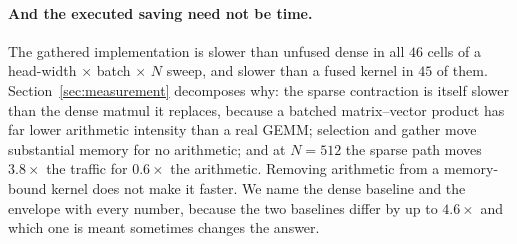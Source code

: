 \paragraph{And the executed saving need not be time.} The gathered
implementation is slower than unfused dense in all $46$ cells of a head-width
$\times$ batch $\times$ $N$ sweep, and slower than a fused kernel in $45$ of
them. Section~\ref{sec:measurement} decomposes why: the sparse contraction is
itself slower than the dense matmul it replaces, because a batched
matrix--vector product has far lower arithmetic intensity than a real GEMM;
selection and gather move substantial memory for no arithmetic; and at
$N{=}512$ the sparse path moves $3.8\times$ the traffic for $0.6\times$ the
arithmetic. Removing arithmetic from a memory-bound kernel does not make it
faster. We name the dense baseline and the envelope with every number, because
the two baselines differ by up to $4.6\times$ and which one is meant sometimes
changes the answer.

